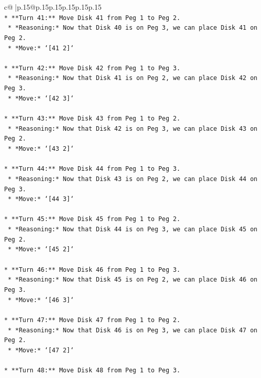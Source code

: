 \documentclass{article}
\begin{document}
{\begin{supertabular}{c@{$\;$}|p{.15\linewidth}@{}p{.15\linewidth}p{.15\linewidth}p{.15\linewidth}p{.15\linewidth}p{.15\linewidth}}
{{{\\ 
\texttt{*   **Turn 41:** Move Disk 41 from Peg 1 to Peg 2.} \\
\texttt{    *   *Reasoning:* Now that Disk 40 is on Peg 3, we can place Disk 41 on Peg 2.} \\
\texttt{    *   *Move:* `{[}41 2{]}`} \\
\\ 
\texttt{*   **Turn 42:** Move Disk 42 from Peg 1 to Peg 3.} \\
\texttt{    *   *Reasoning:* Now that Disk 41 is on Peg 2, we can place Disk 42 on Peg 3.} \\
\texttt{    *   *Move:* `{[}42 3{]}`} \\
\\ 
\texttt{*   **Turn 43:** Move Disk 43 from Peg 1 to Peg 2.} \\
\texttt{    *   *Reasoning:* Now that Disk 42 is on Peg 3, we can place Disk 43 on Peg 2.} \\
\texttt{    *   *Move:* `{[}43 2{]}`} \\
\\ 
\texttt{*   **Turn 44:** Move Disk 44 from Peg 1 to Peg 3.} \\
\texttt{    *   *Reasoning:* Now that Disk 43 is on Peg 2, we can place Disk 44 on Peg 3.} \\
\texttt{    *   *Move:* `{[}44 3{]}`} \\
\\ 
\texttt{*   **Turn 45:** Move Disk 45 from Peg 1 to Peg 2.} \\
\texttt{    *   *Reasoning:* Now that Disk 44 is on Peg 3, we can place Disk 45 on Peg 2.} \\
\texttt{    *   *Move:* `{[}45 2{]}`} \\
\\ 
\texttt{*   **Turn 46:** Move Disk 46 from Peg 1 to Peg 3.} \\
\texttt{    *   *Reasoning:* Now that Disk 45 is on Peg 2, we can place Disk 46 on Peg 3.} \\
\texttt{    *   *Move:* `{[}46 3{]}`} \\
\\ 
\texttt{*   **Turn 47:** Move Disk 47 from Peg 1 to Peg 2.} \\
\texttt{    *   *Reasoning:* Now that Disk 46 is on Peg 3, we can place Disk 47 on Peg 2.} \\
\texttt{    *   *Move:* `{[}47 2{]}`} \\
\\ 
\texttt{*   **Turn 48:** Move Disk 48 from Peg 1 to Peg 3.} \\
}}}
\end{supertabular}}
\end{document}
